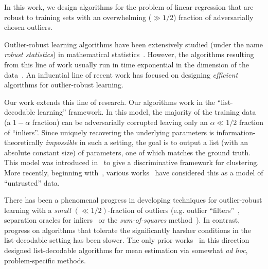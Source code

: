 

In this work, we design algorithms for the problem of linear regression that are robust to training sets with an overwhelming ($\gg 1/2$) fraction of adversarially chosen outliers. 

Outlier-robust learning algorithms have been extensively studied (under the name \emph{robust statistics}) in mathematical statistics~\cite{MR0426989,maronna2006robust,huber2011robust,hampel2011robust}. However, the algorithms resulting from this line of work usually run in time exponential in the dimension of the data~\cite{bernholt2006robust}. An influential line of recent work \cite{journals/jmlr/KlivansLS09,journals/corr/AwasthiBL13, DBLP:journals/corr/DiakonikolasKKL16,DBLP:conf/focs/LaiRV16,DBLP:conf/stoc/CharikarSV17,KothariSteinhardt17,2017KS,HopkinsLi17,DBLP:journals/corr/DiakonikolasKK017a,DBLP:journals/corr/DiakonikolasKS17,DBLP:conf/colt/KlivansKM18} has focused on designing \emph{efficient} algorithms for outlier-robust learning. 

Our work extends this line of research. Our algorithms work in the ``list-decodable learning'' framework. In this model, the majority of the training data (a $1 -\alpha$ fraction) can be adversarially corrupted leaving only an $\alpha \ll 1/2$ fraction of ``inliers''. Since uniquely recovering the underlying parameters is information-theoretically \emph{impossible} in such a setting, the goal is to output a list (with an absolute constant size) of parameters, one of which matches the ground truth. This model was introduced in~\cite{DBLP:conf/stoc/BalcanBV08} to give a discriminative framework for clustering. More recently, beginning with~\cite{DBLP:conf/stoc/CharikarSV17}, various works~\cite{DBLP:conf/stoc/DiakonikolasKS18,KothariSteinhardt17} have considered this as a model of ``untrusted'' data. 

There has been a phenomenal progress in developing techniques for outlier-robust learning with a \emph{small} $(\ll 1/2)$-fraction of outliers (e.g. outlier ``filters''~\cite{DBLP:conf/focs/DiakonikolasKK016,DBLP:journals/corr/DiakonikolasKK017a}, separation oracles for inliers~\cite{DBLP:conf/focs/DiakonikolasKK016} or the \emph{sum-of-squares} method~\cite{2017KS,HopkinsLi17,KothariSteinhardt17,DBLP:conf/colt/KlivansKM18}). In contrast, progress on algorithms that tolerate the significantly harsher conditions in the list-decodable setting has been slower. The only prior works~\cite{DBLP:conf/stoc/CharikarSV17,DBLP:conf/stoc/DiakonikolasKS18,KothariSteinhardt17} in this direction designed list-decodable algorithms for mean estimation via somewhat \emph{ad hoc}, problem-specific methods. 

